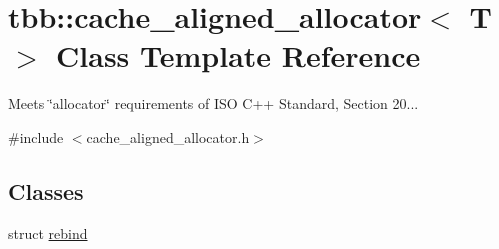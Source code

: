 \hypertarget{classtbb_1_1cache__aligned__allocator}{}\section{tbb\+:\+:cache\+\_\+aligned\+\_\+allocator$<$ T $>$ Class Template Reference}
\label{classtbb_1_1cache__aligned__allocator}


Meets \char`\"{}allocator\char`\"{} requirements of I\+S\+O C++ Standard, Section 20...  




{\ttfamily \#include $<$cache\+\_\+aligned\+\_\+allocator.\+h$>$}

\subsection*{Classes}
\begin{DoxyCompactItemize}
\item 
struct \hyperlink{structtbb_1_1cache__aligned__allocator_1_1rebind}{rebind}
\end{DoxyCompactItemize}
